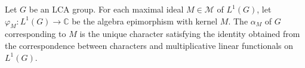 \begin{definition}
Let $G$ be an LCA group. For each maximal ideal $M \in \mathcal{M}$ of $L^1(G)$, let $\varphi_M: L^1(G) \to \mathbb{C}$ be the algebra epimorphism with kernel $M$. The  $\alpha_M$ of $G$ corresponding to $M$ is the unique character satisfying the identity obtained from the correspondence between characters and multiplicative linear functionals on $L^1(G)$.
\end{definition}
